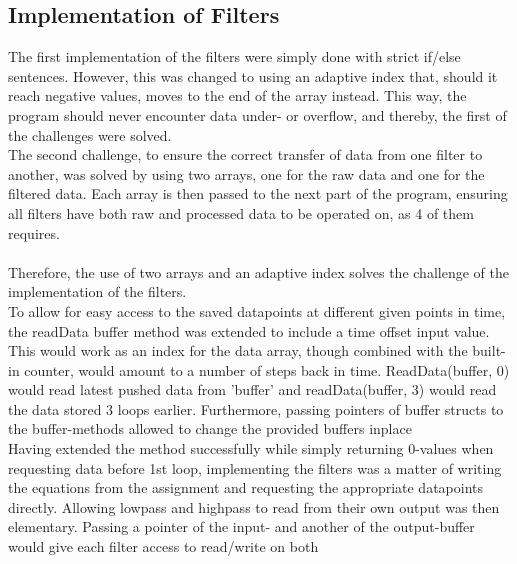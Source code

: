 \documentclass[12pt,a4paper]{article}
\begin{document}
\subsection{Implementation of Filters}
	The first implementation of the filters were simply done with strict if/else sentences. However, this was changed to using an adaptive index that, should it reach negative values, moves to the end of the array instead. This way, the program should never encounter data under- or overflow, and thereby, the first of the challenges were solved.\\
	The second challenge, to ensure the correct transfer of data from one filter to another, was solved by using two arrays, one for the raw data and one for the filtered data. Each array is then passed to the next part of the program, ensuring all filters have both raw and processed data to be operated on, as 4 of them requires.\\
	\\
	Therefore, the use of two arrays and an adaptive index solves the challenge of the implementation of the filters.\\
	
	To allow for easy access to the saved datapoints at different given points in time, the readData buffer method was extended to include a time offset input value. This would work as an index for the data array, though combined with the built-in counter, would amount to a number of steps back in time. ReadData(buffer, 0) would read latest pushed data from 'buffer' and readData(buffer, 3) would read the data stored 3 loops earlier. Furthermore, passing pointers of buffer structs to the buffer-methods allowed to change the provided buffers inplace\\	
Having extended the method successfully while simply returning 0-values when requesting data before 1st loop, implementing the filters was a matter of writing the equations from the assignment and requesting the appropriate datapoints directly.
	Allowing lowpass and highpass to read from their own output was then elementary. Passing a pointer of the input- and another of the output-buffer would give each filter access to read/write on both\\
	
\end{document}
